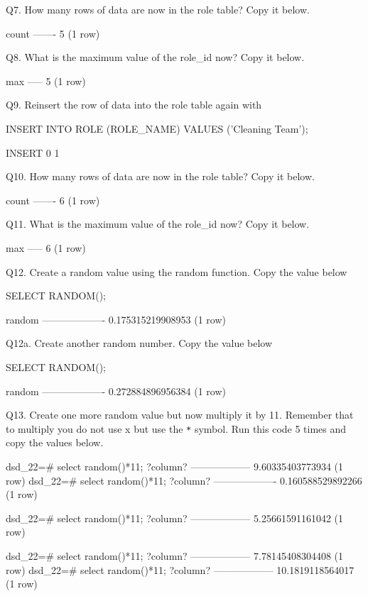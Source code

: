 Q7. How many rows of data are now in the role table? Copy it below.
\begin{pseudo*}
count
-------
      5
(1 row)
\end{pseudo*}

Q8. What is the maximum value of the role\_id now? Copy it below.
\begin{pseudo*}
max
-----
    5
(1 row)
\end{pseudo*}

Q9. Reinsert the row of data into the role table again with   
\begin{sql}
INSERT INTO ROLE (ROLE_NAME) VALUES ('Cleaning Team');
\end{sql}
\begin{pseudo*}
INSERT 0 1
\end{pseudo*}

Q10. How many rows of data are now in the role table? Copy it below.
\begin{pseudo*}
count
-------
        6
(1 row)
\end{pseudo*}

Q11. What is the maximum value of the role\_id now? Copy it below.
\begin{pseudo*}
max
-----
    6
(1 row)
\end{pseudo*}

Q12. Create a random value using the random function. Copy the value below
\begin{sql}
SELECT RANDOM(); 
\end{sql}
\begin{pseudo*}
      random       
-------------------
 0.175315219908953
(1 row)
\end{pseudo*}

Q12a.  Create another random number. Copy the value below
\begin{sql}
SELECT RANDOM(); 
\end{sql}
\begin{pseudo*}
      random
-------------------
 0.272884896956384
(1 row)
\end{pseudo*}

Q13. Create one more random value but now multiply it by 11. Remember that to multiply you do not use x but use the \verb|*| symbol. Run this code 5 times and copy the values below.
\begin{pseudo*}
dsd_22=# select random()*11;
     ?column?
------------------
 9.60335403773934
(1 row)
dsd_22=# select random()*11;
     ?column?
-------------------
 0.160588529892266
(1 row)

dsd_22=# select random()*11;
     ?column?
------------------
 5.25661591161042
(1 row)

dsd_22=# select random()*11;
     ?column?
------------------
 7.78145408304408
(1 row)
dsd_22=# select random()*11;
     ?column?     
------------------
 10.1819118564017
(1 row)
\end{pseudo*}

